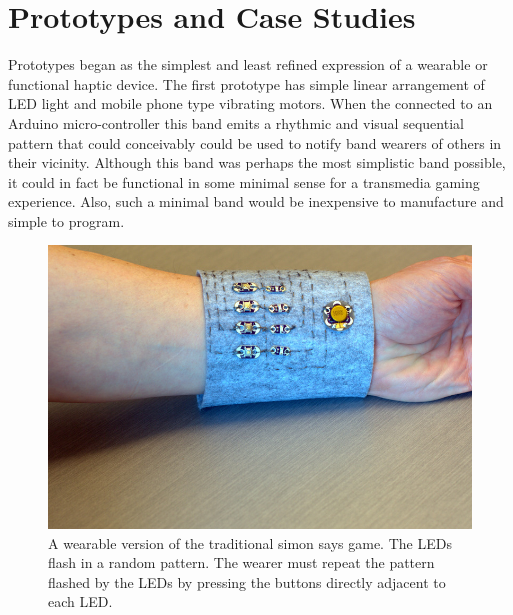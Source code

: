 \documentclass{chi-ext}
\begin{document}
\section{Prototypes and Case Studies}

Prototypes began as the simplest and least refined expression of a wearable or functional haptic device. The first prototype has simple linear arrangement of LED light and mobile phone type vibrating motors. When the connected to an Arduino micro-controller this band emits a rhythmic and visual sequential pattern that could conceivably could be used to notify band wearers of others in their vicinity. Although this band was perhaps the most simplistic band possible, it could in fact be functional in some minimal sense for a transmedia gaming experience. Also, such a minimal band would be inexpensive to manufacture and simple to program. 



\begin{figure}
  \begin{center}
  \includegraphics[width=\columnwidth]{images/P1130375.jpg}
  \caption{A wearable version of the traditional simon says game. The LEDs flash in a random pattern. The wearer must repeat the pattern flashed by the LEDs by pressing the buttons directly adjacent to each LED.}
  \label{fig:marginparsample}
  \end{center}  
\end{figure}
\end{document}
